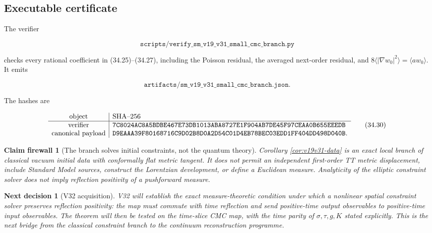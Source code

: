 \documentclass[11pt]{article}
\newtheorem{firewall}[theorem]{Claim firewall}
\newtheorem{decision}[theorem]{Next decision}
\theoremstyle{remark}
\begin{document}
\subsection{Executable certificate}

The verifier

\[
 \texttt{scripts/verify\_sm\_v19\_v31\_small\_cmc\_branch.py} \tag{34.28}
\]

checks every rational coefficient in (34.25)--(34.27), including the
Poisson residual, the averaged next-order residual, and
\(8\langle|\nabla w_0|^2\rangle=\langle aw_0\rangle\).  It emits

\[
 \texttt{artifacts/sm\_v19\_v31\_small\_cmc\_branch.json}.     \tag{34.29}
\]

The hashes are

\[
\begin{array}{c|l}
\hbox{object}&\hbox{SHA--256}\\ \hline
\hbox{verifier}&
\texttt{7C8024AC8A5BDBE467E73DB1013ABA8727E1F904AB7DE45F97CEAA0B655EEEDB}\\
\hbox{canonical payload}&
\texttt{D9EAAA39F80168716C9D02B8D0A2D54C01D4EB78BEC03EDD1FF404DD498D040B}.
\end{array}                                                     \tag{34.30}
\]

\begin{firewall}[The branch solves initial constraints, not the quantum theory]
\label{fire:v19v31}
Corollary \ref{cor:v19v31-data} is an exact local branch of classical
vacuum initial data with conformally flat metric tangent.  It does not
permit an independent first-order TT metric displacement, include
Standard Model sources, construct the Lorentzian development, or define
a Euclidean measure.  Analyticity of the elliptic constraint solver does
not imply reflection positivity of a pushforward measure.
\end{firewall}

\begin{decision}[V32 acquisition]
\label{dec:v19v31-next}
V32 will establish the exact measure-theoretic condition under which a
nonlinear spatial constraint solver preserves reflection positivity:
the map must commute with time reflection and send positive-time output
observables to positive-time input observables.  The theorem will then be
tested on the time-slice CMC map, with the time parity of
\(\sigma,\tau,g,K\) stated explicitly.  This is the next bridge from the
classical constraint branch to the continuum reconstruction programme.
\end{decision}
\end{document}
